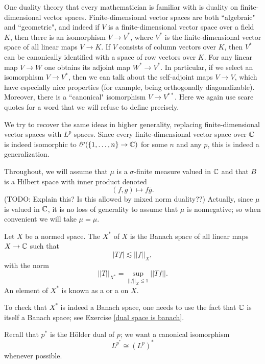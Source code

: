 One duality theory that every mathematician is familiar with is duality on finite-dimensional vector spaces.
Finite-dimensional vector spaces are both ``algebraic" and ``geometric", and indeed if $V$ is a finite-dimensional vector space over a field $K$, then there is an isomorphism $V \to V^*$, where $V^*$ is the finite-dimensional vector space of all linear maps $V \to K$.
If $V$ consists of column vectors over $K$, then $V^*$ can be canonically identified with a space of row vectors over $K$.
For any linear map $V \to W$ one obtains its adjoint map $W^* \to V^*$.
In particular, if we select an isomorphism $V \to V^*$, then we can talk about the self-adjoint maps $V \to V$, which have especially nice properties (for example, being orthogonally diagonalizable).
Moreover, there is a ``canonical" isomorphism $V \to V^{**}$.
Here we again use scare quotes for a word that we will refuse to define precisely.

We try to recover the same ideas in higher generality, replacing finite-dimensional vector spaces with $L^p$ spaces.
Since every finite-dimensional vector space over $\mathbb{C}$ is indeed isomorphic to $\ell^p(\{1, \dots, n\} \to \mathbb{C})$ for some $n$ and any $p$, this is indeed a generalization.

Throughout, we will assume that $\mu$ is a $\sigma$-finite measure valued in $\mathbb{C}$ and that $B$ is a Hilbert space with inner product denoted
$$(f, g) \mapsto f \overline g.$$
(TODO: Explain this? Is this allowed by mixed norm duality??)
Actually, since $\mu$ is valued in $\mathbb{C}$, it is no loss of generality to assume that $\mu$ is nonnegative; so when convenient we will take $\mu = \mu$.

\begin{definition}
Let $X$ be a normed space.
The  $X^*$ of $X$ is the Banach space of all linear maps $X \to \mathbb{C}$ such that
\begin{equation}
\label{bounded covector}
|Tf| \lesssim ||f||_X,
\end{equation}
with the norm
$$||T||_{X^*} = \sup_{||f||_X \leq 1} ||Tf||.$$
An element of $X^*$ is known as a  or a  on $X$.
\end{definition}

To check that $X^*$ is indeed a Banach space, one needs to use the fact that $\mathbb{C}$ is itself a Banach space; see Exercise \ref{dual space is banach}.

Recall that $p^*$ is the H\"older dual of $p$; we want a canonical isomorphism
$$L^{p^*} \cong (L^p)^*$$
whenever possible.

